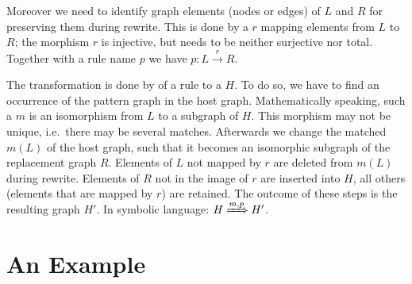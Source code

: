 Moreover we need to identify graph elements (nodes or edges) of $L$ and $R$ for preserving them during rewrite.
This is done by a  $r$ mapping elements from $L$ to $R$; the morphism $r$ is injective, but needs to be neither surjective nor total.
Together with a rule name $p$ we have $p : L \xrightarrow{r} R$.

The transformation is done by  of a rule to a  $H$.
To do so, we have to find an occurrence of the pattern graph in the host graph.
Mathematically speaking, such a  $m$ is an isomorphism from $L$ to a subgraph of $H$.
This morphism may not be unique, i.e.\ there may be several matches.
Afterwards we change the matched  $m(L)$ of the host graph, such that it becomes an isomorphic subgraph of the replacement graph $R$.
Elements of $L$ not mapped by $r$ are deleted from $m(L)$ during rewrite.
Elements of $R$ not in the image of $r$ are inserted into $H$, all others (elements that are mapped by $r$) are retained.
The outcome of these steps is the resulting graph $H'$. In symbolic language: $H \xRightarrow{m, p} H'$.


\section{An Example}
\label{ov:example}

